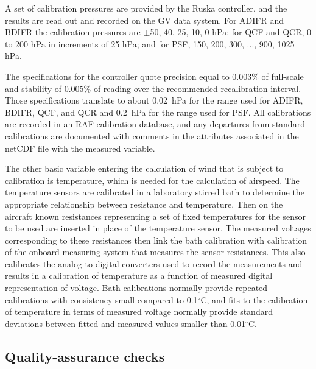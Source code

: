 \documentclass[12pt,twoside,english]{article}\usepackage[]{graphicx}\usepackage[]{color}
\let\OrgIndex\index
\renewcommand*{\index}[1]{\OrgIndex{#1}}
\begin{document}
A set of calibration pressures are provided by the Ruska controller, and the results are read out and recorded on the GV data system. For ADIFR and BDIFR the calibration pressures are $\pm$50, 40, 25, 10, 0 hPa; for QCF and QCR, 0 to 200 hPa in increments of 25 hPa; and for PSF, 150, 200, 300, ..., 900, 1025 hPa.

The specifications for the controller quote precision equal to 0.003\% of full-scale and stability of 0.005\% of reading over the recommended recalibration interval. Those specifications translate to about 0.02~hPa for the range used for ADIFR, BDIFR, QCF, and QCR and 0.2~hPa for the range used for PSF. %
All calibrations are recorded in an RAF calibration database, and any departures from standard calibrations are documented with comments in the attributes associated in the netCDF file with the measured variable.

The other basic variable entering the calculation of wind that is subject to calibration is temperature, which is needed for the calculation of airspeed. The temperature sensors are calibrated in a laboratory stirred bath to determine the appropriate relationship between resistance and temperature. Then on the aircraft known resistances representing a set of fixed temperatures for the sensor to be used are inserted in place of the temperature sensor. The measured voltages corresponding to these resistances then link the bath calibration with calibration of the onboard measuring system that measures the sensor resistances. This also calibrates the analog-to-digital converters used to record the measurements and results in a calibration of temperature as a function of measured digital representation of voltage. Bath calibrations normally provide repeated calibrations with consistency small compared to 0.1$^{\circ}$C, and fits to the calibration of temperature in terms of measured voltage normally provide standard deviations between fitted and measured values smaller than 0.01$^{\circ}$C.


\subsection{Quality-assurance checks}
\end{document}
